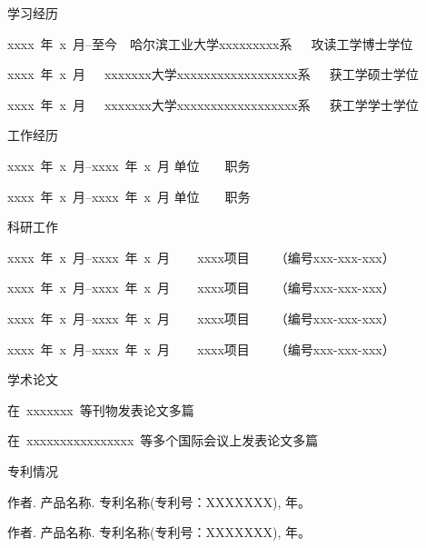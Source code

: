 


{\hei 学习经历}
\begin{publist}
\item xxxx~年~x~月--至今~~哈尔滨工业大学xxxxxxxxx系~~~攻读工学博士学位
\item xxxx~年~x~月~~~xxxxxxx大学xxxxxxxxxxxxxxxxxx系~~~获工学硕士学位
\item xxxx~年~x~月~~~xxxxxxx大学xxxxxxxxxxxxxxxxxx系~~~获工学学士学位
\end{publist}

{\hei 工作经历}
\begin{publist}
\item xxxx~年~x~月--xxxx~年~x~月  单位　　职务
\item xxxx~年~x~月--xxxx~年~x~月  单位　　职务
\end{publist}

{\hei 科研工作}
\begin{publist}
\item  xxxx~年~x~月--xxxx~年~x~月 ~~~ xxxx项目~~~~（编号xxx-xxx-xxx）　
\item  xxxx~年~x~月--xxxx~年~x~月 ~~~ xxxx项目~~~~（编号xxx-xxx-xxx）
\item  xxxx~年~x~月--xxxx~年~x~月 ~~~ xxxx项目~~~~（编号xxx-xxx-xxx）
\item  xxxx~年~x~月--xxxx~年~x~月 ~~~ xxxx项目~~~~（编号xxx-xxx-xxx）
\end{publist}

{\hei 学术论文}
\begin{publist}
\item 在~xxxxxxx~等刊物发表论文多篇
\item 在~xxxxxxxxxxxxxxxx~等多个国际会议上发表论文多篇
\end{publist}

{\hei 专利情况}
\begin{publist}
\item 作者. 产品名称. 专利名称(专利号：XXXXXXX), 年。
\item 作者. 产品名称. 专利名称(专利号：XXXXXXX), 年。
\end{publist}
